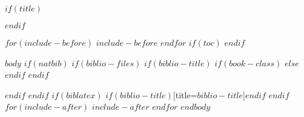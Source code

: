 \documentclass[$if(fontsize)$$fontsize$,$endif$$if(lang)$$lang$,$endif$]{$documentclass$}
\author{$for(author)$$author$$sep$ \and $endfor$}
\date{$date$}
\begin{document}
	$if(title)$
		\maketitle
	$endif$

	\newpage

	$for(include-before)$ $include-before$ $endfor$
	$if(toc)$
	{
		\hypersetup{linkcolor=black}
		\setcounter{tocdepth}{$toc-depth$}
		\tableofcontents
	}
	$endif$

	\newpage

	$body$
		$if(natbib)$
			$if(biblio-files)$
				$if(biblio-title)$
					$if(book-class)$
						\renewcommand\bibname{$biblio-title$}
					$else$
						\renewcommand\refname{$biblio-title$}
					$endif$
				$endif$
				
			$endif$
		$endif$
		$if(biblatex)$
			\printbibliography$if(biblio-title)$[title=$biblio-title$]$endif$
		$endif$
		$for(include-after)$
			$include-after$
		$endfor$
	$endbody$
\end{document}
